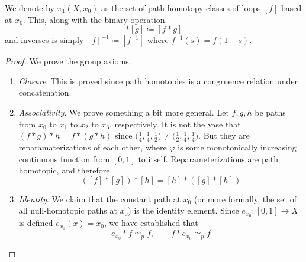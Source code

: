   \begin{definition}
    We denote by $\pi_1 (X, x_0)$ as the set of path homotopy classes of loops $[f]$ based at $x_0$. This, along with the binary operation. 
    \begin{equation}
      [f] \ast [g] \coloneqq [f \ast g] 
    \end{equation}
    and inverses is simply $[f]^{-1} \coloneqq [f^{-1}]$ where $f^{-1} (s) = f(1 - s)$. 
  \end{definition}
  \begin{proof}
    We prove the group axioms. 
    \begin{enumerate}
      \item \textit{Closure}. This is proved since path homotopies is a congruence relation under concatenation. 
      \item \textit{Associativity}. We prove something a bit more general. Let $f, g, h$ be paths from $x_0$ to $x_1$ to $x_2$ to $x_3$, respectively.  It is not the vase that $(f \ast g) \ast h = f \ast (g \ast h)$ since $\big( \frac{1}{4}, \frac{1}{4}, \frac{1}{2} \big) \neq \big( \frac{1}{2}, \frac{1}{4}, \frac{1}{4} \big)$. But they are reparamaterizations of each other, where $\varphi$ is some monotonically increasing continuous function from $[0, 1]$ to itself. Reparameterizations are path homotopic, and therefore 
        \begin{equation}
          ([f] \ast [g]) \ast [h] = [h] \ast ([g] \ast [h]) 
        \end{equation}

      \item \textit{Identity}. We claim that the constant path at $x_0$ (or more formally, the set of all null-homotopic paths at $x_0$) is the identity element. Since $e_{x_0}: [0, 1] \to X$ is defined $e_{x_0} (x) = x_{0}$, we have established that 
        \begin{equation}
          e_{x_0} \ast f \simeq_p f, \qquad f \ast e_{x_0} \simeq_p f
        \end{equation}


\end{enumerate}
\end{proof}
